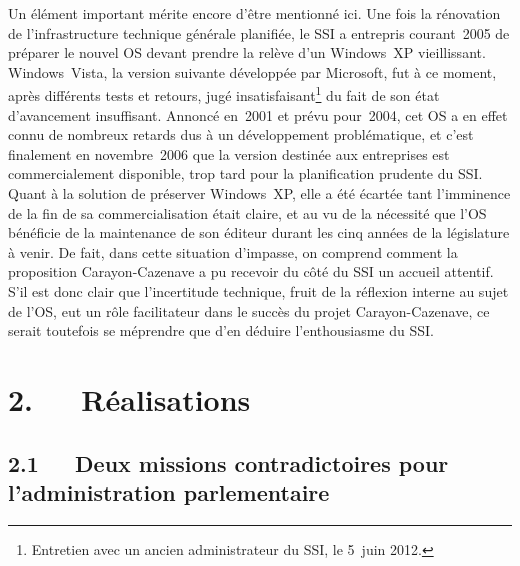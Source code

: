 \documentclass{FramateX}
\begin{document}
\begin{refsection}
Un élément important mérite encore d'être mentionné ici. Une fois la
rénovation de l'infrastructure technique générale planifiée, le SSI a
entrepris courant~2005 de préparer le nouvel OS devant prendre la
relève d'un Windows~XP vieillissant. Windows~Vista, la version suivante
développée par Microsoft, fut à ce moment, après différents tests et
retours, jugé insatisfaisant\footnote{Entretien avec un ancien
administrateur du SSI, le 5~juin 2012.} du fait de son état
d'avancement insuffisant. Annoncé en~2001 et prévu pour~2004, cet OS a
en effet connu de nombreux retards dus à un développement
problématique, et c'est finalement en novembre~2006 que la version
destinée aux entreprises est commercialement disponible, trop tard pour
la planification prudente du SSI. Quant à la solution de préserver
Windows~XP, elle a été écartée tant l'imminence de la fin de sa
commercialisation était claire, et au vu de la nécessité que l'OS
bénéficie de la maintenance de son éditeur durant les cinq années de la
législature à venir. De fait, dans cette situation d'impasse, on
comprend comment la proposition Carayon-Cazenave a pu recevoir du côté
du SSI un accueil attentif. S'il est donc clair que l'incertitude
technique, fruit de la réflexion interne au sujet de l'OS, eut un rôle
facilitateur dans le succès du projet Carayon-Cazenave, ce serait
toutefois se méprendre que d'en déduire l'enthousiasme du SSI. 

\section*{2.~~~Réalisations}
{}

\subsection*{2.1~~~Deux missions contradictoires pour l'administration parlementaire}
{}


\end{refsection}
\end{document}
